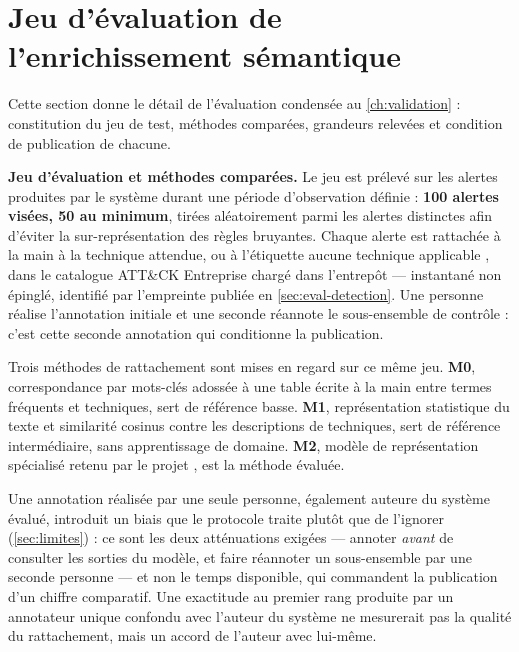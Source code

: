 \section{Jeu d'évaluation de l'enrichissement sémantique}
\label{ann:evaluation-semantique}

Cette section donne le détail de l'évaluation condensée au \cref{ch:validation} :
constitution du jeu de test, méthodes comparées, grandeurs relevées et condition de publication de
chacune.

\medskip
\noindent\textbf{Jeu d'évaluation et méthodes comparées.} Le jeu est prélevé sur les alertes produites par le système durant une période d'observation
définie : \textbf{100 alertes visées, 50 au minimum}, tirées aléatoirement parmi les alertes
distinctes afin d'éviter la sur-représentation des règles bruyantes. Chaque alerte est rattachée
à la main à la technique attendue, ou à l'étiquette \og aucune technique applicable \fg{}, dans le
catalogue ATT\&CK Entreprise chargé dans l'entrepôt --- instantané non épinglé, identifié par
l'empreinte publiée en \cref{sec:eval-detection}. Une personne réalise l'annotation initiale et une
seconde réannote le sous-ensemble de contrôle : c'est cette seconde annotation qui conditionne la
publication.

Trois méthodes de rattachement sont mises en regard sur ce même jeu. \textbf{M0}, correspondance
par mots-clés adossée à une table écrite à la main entre termes fréquents et techniques, sert de
référence basse. \textbf{M1}, représentation statistique du texte et similarité cosinus contre les
descriptions de techniques, sert de référence intermédiaire, sans apprentissage de domaine.
\textbf{M2}, modèle de représentation spécialisé retenu par le projet
\cite{securebert2022,smet2023}, est la méthode évaluée.

Une annotation réalisée par une seule personne, également auteure du système évalué, introduit un
biais que le protocole traite plutôt que de l'ignorer (\cref{sec:limites}) : ce sont les deux
atténuations exigées --- annoter \emph{avant} de consulter les sorties du modèle, et faire réannoter
un sous-ensemble par une seconde personne --- et non le temps disponible, qui commandent la
publication d'un chiffre comparatif. Une exactitude au premier rang produite par un annotateur
unique confondu avec l'auteur du système ne mesurerait pas la qualité du rattachement, mais un
accord de l'auteur avec lui-même.

